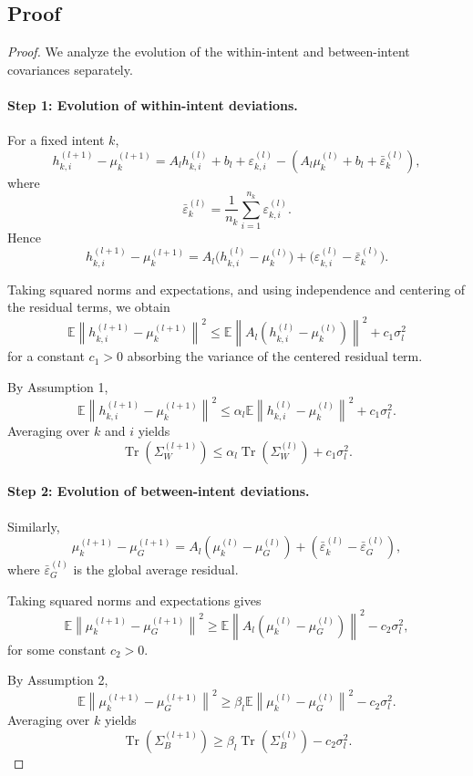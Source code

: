 \documentclass[11pt]{article}
\newcommand{\E}{\mathbb{E}}
\newcommand{\tr}{\operatorname{Tr}}
\begin{document}
\subsection{Proof}

\begin{proof}
We analyze the evolution of the within-intent and between-intent covariances separately.

\paragraph{Step 1: Evolution of within-intent deviations.}
For a fixed intent $k$,
\[
h_{k,i}^{(l+1)} - \mu_k^{(l+1)}
=
A_l h_{k,i}^{(l)} + b_l + \varepsilon_{k,i}^{(l)}
-
\left(
A_l \mu_k^{(l)} + b_l + \bar{\varepsilon}_k^{(l)}
\right),
\]
where
\[
\bar{\varepsilon}_k^{(l)} = \frac{1}{n_k}\sum_{i=1}^{n_k}\varepsilon_{k,i}^{(l)}.
\]
Hence
\[
h_{k,i}^{(l+1)} - \mu_k^{(l+1)}
=
A_l\bigl(h_{k,i}^{(l)} - \mu_k^{(l)}\bigr)
+
\bigl(\varepsilon_{k,i}^{(l)} - \bar{\varepsilon}_k^{(l)}\bigr).
\]

Taking squared norms and expectations, and using independence and centering of the residual terms, we obtain
\[
\E\left\|
h_{k,i}^{(l+1)} - \mu_k^{(l+1)}
\right\|^2
\le
\E\left\|
A_l(h_{k,i}^{(l)} - \mu_k^{(l)})
\right\|^2
+
c_1\sigma_l^2
\]
for a constant $c_1>0$ absorbing the variance of the centered residual term.

By Assumption 1,
\[
\E\left\|
h_{k,i}^{(l+1)} - \mu_k^{(l+1)}
\right\|^2
\le
\alpha_l
\E\left\|
h_{k,i}^{(l)} - \mu_k^{(l)}
\right\|^2
+
c_1 \sigma_l^2.
\]
Averaging over $k$ and $i$ yields
\[
\tr(\Sigma_W^{(l+1)})
\le
\alpha_l \tr(\Sigma_W^{(l)}) + c_1 \sigma_l^2.
\]

\paragraph{Step 2: Evolution of between-intent deviations.}
Similarly,
\[
\mu_k^{(l+1)} - \mu_G^{(l+1)}
=
A_l(\mu_k^{(l)} - \mu_G^{(l)})
+
(\bar{\varepsilon}_k^{(l)} - \bar{\varepsilon}_G^{(l)}),
\]
where $\bar{\varepsilon}_G^{(l)}$ is the global average residual.

Taking squared norms and expectations gives
\[
\E\left\|
\mu_k^{(l+1)} - \mu_G^{(l+1)}
\right\|^2
\ge
\E\left\|
A_l(\mu_k^{(l)} - \mu_G^{(l)})
\right\|^2
-
c_2 \sigma_l^2,
\]
for some constant $c_2>0$.

By Assumption 2,
\[
\E\left\|
\mu_k^{(l+1)} - \mu_G^{(l+1)}
\right\|^2
\ge
\beta_l
\E\left\|
\mu_k^{(l)} - \mu_G^{(l)}
\right\|^2
-
c_2 \sigma_l^2.
\]
Averaging over $k$ yields
\[
\tr(\Sigma_B^{(l+1)})
\ge
\beta_l \tr(\Sigma_B^{(l)}) - c_2 \sigma_l^2.
\]


\end{proof}
\end{document}
